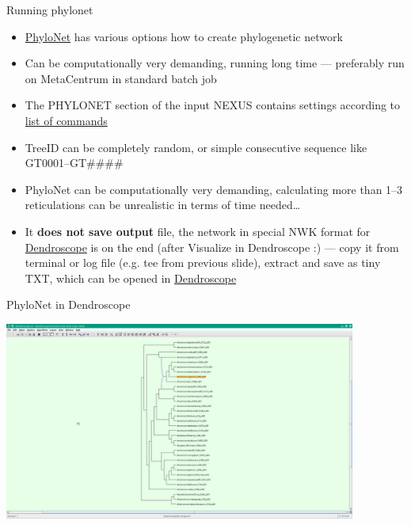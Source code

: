 \documentclass[compress,  xelatex, 11pt, xcolor=x11names, aspectratio=169,
	hyperref={
		bookmarks=true,
		unicode=true,
		colorlinks=true,
		pdftitle={HybSeq course},
		plainpages=false,
		pdfauthor={Vojtech Zeisek},
		pdfsubject={Practical processing of HybSeq target enrichment sequencing data on computing grids like MetaCentrum},
		pdfcreator={XeLaTeX},
		pdfkeywords={BASH, command line, GNU, HybSeq, Linux, MetaCentrum, sequencing shell, target enrichment},
		linkcolor=Turquoise4, %
		anchorcolor=DodgerBlue4, %
		citecolor=DodgerBlue4, %
		filecolor=DodgerBlue4, %
		menucolor=Tan4, %
		urlcolor=DarkOliveGreen4 %
		},
	url={hyphens, lowtilde} %
	]{beamer}
\renewcommand{\texttt}[1]{\colorbox{Cornsilk2}{{\ttfamily #1}}}
\begin{document}
\begin{frame}{Running phylonet}
	\begin{itemize}
		\item \href{https://phylogenomics.rice.edu/html/phylonet.html}{PhyloNet} has various options how to create phylogenetic network
		\item Can be computationally very demanding, running long time --- preferably run on MetaCentrum in standard batch job
		\item The \texttt{PHYLONET} section of the input NEXUS contains settings according to \href{https://wiki.rice.edu/confluence/display/PHYLONET/List+of+PhyloNet+Commands}{list of commands}
		\item TreeID can be completely random, or simple consecutive sequence like GT0001--GT\#\#\#\#
		\item PhyloNet can be computationally very demanding, calculating more than 1--3 reticulations can be unrealistic in terms of time needed\ldots
		\item It \textbf{does not save output} file, the network in special NWK format for \href{https://www.wsi.uni-tuebingen.de/lehrstuehle/algorithms-in-bioinformatics/software/dendroscope/}{Dendroscope} is on the end (after \texttt{Visualize in Dendroscope :}) --- copy it from terminal or log file (e.g. \texttt{tee} from previous slide), extract and save as tiny TXT, which can be opened in \href{https://www.wsi.uni-tuebingen.de/lehrstuehle/algorithms-in-bioinformatics/software/dendroscope/}{Dendroscope}
	\end{itemize}
\end{frame}

\begin{frame}{PhyloNet in Dendroscope}
	\begin{center}
		\includegraphics[height=6.5cm]{dendroscope.png}
	\end{center}
\end{frame}
\end{document}

